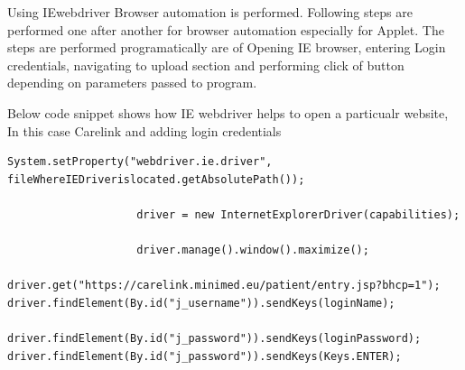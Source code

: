 \documentclass[article,type=msc,colorback,accentcolor=tud9c,twoside,11pt]{tudthesis}
\begin{document}
Using IEwebdriver Browser automation is performed. Following steps are performed one after another for browser automation especially for Applet. The steps are performed programatically are of Opening IE browser, entering Login credentials, navigating to upload section and performing click of button depending on parameters passed to program.

Below code snippet shows how IE webdriver helps to open a particualr website, In this case Carelink and adding login credentials
\begin{lstlisting}
System.setProperty("webdriver.ie.driver", fileWhereIEDriverislocated.getAbsolutePath());

					driver = new InternetExplorerDriver(capabilities);

					driver.manage().window().maximize();
					driver.get("https://carelink.minimed.eu/patient/entry.jsp?bhcp=1");
driver.findElement(By.id("j_username")).sendKeys(loginName);
				driver.findElement(By.id("j_password")).sendKeys(loginPassword);
driver.findElement(By.id("j_password")).sendKeys(Keys.ENTER);
\end{lstlisting}
\end{document}
